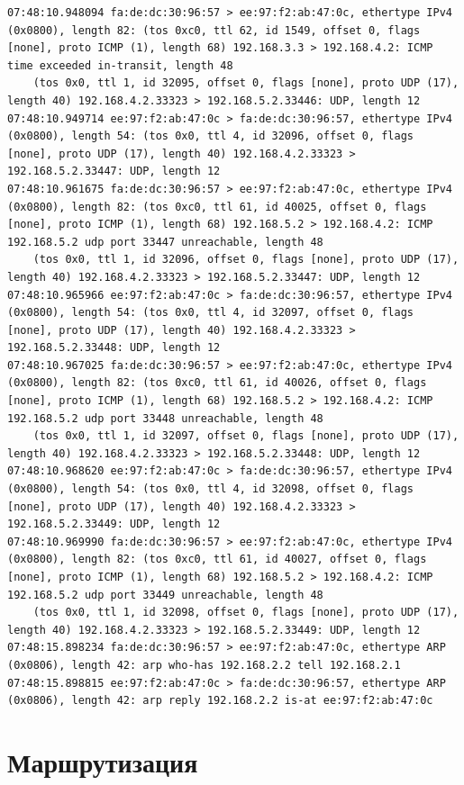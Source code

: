 \documentclass[a4paper,12pt]{article}
\begin{document}
\begin{Verbatim}
07:48:10.948094 fa:de:dc:30:96:57 > ee:97:f2:ab:47:0c, ethertype IPv4 (0x0800), length 82: (tos 0xc0, ttl 62, id 1549, offset 0, flags [none], proto ICMP (1), length 68) 192.168.3.3 > 192.168.4.2: ICMP time exceeded in-transit, length 48
	(tos 0x0, ttl 1, id 32095, offset 0, flags [none], proto UDP (17), length 40) 192.168.4.2.33323 > 192.168.5.2.33446: UDP, length 12
07:48:10.949714 ee:97:f2:ab:47:0c > fa:de:dc:30:96:57, ethertype IPv4 (0x0800), length 54: (tos 0x0, ttl 4, id 32096, offset 0, flags [none], proto UDP (17), length 40) 192.168.4.2.33323 > 192.168.5.2.33447: UDP, length 12
07:48:10.961675 fa:de:dc:30:96:57 > ee:97:f2:ab:47:0c, ethertype IPv4 (0x0800), length 82: (tos 0xc0, ttl 61, id 40025, offset 0, flags [none], proto ICMP (1), length 68) 192.168.5.2 > 192.168.4.2: ICMP 192.168.5.2 udp port 33447 unreachable, length 48
	(tos 0x0, ttl 1, id 32096, offset 0, flags [none], proto UDP (17), length 40) 192.168.4.2.33323 > 192.168.5.2.33447: UDP, length 12
07:48:10.965966 ee:97:f2:ab:47:0c > fa:de:dc:30:96:57, ethertype IPv4 (0x0800), length 54: (tos 0x0, ttl 4, id 32097, offset 0, flags [none], proto UDP (17), length 40) 192.168.4.2.33323 > 192.168.5.2.33448: UDP, length 12
07:48:10.967025 fa:de:dc:30:96:57 > ee:97:f2:ab:47:0c, ethertype IPv4 (0x0800), length 82: (tos 0xc0, ttl 61, id 40026, offset 0, flags [none], proto ICMP (1), length 68) 192.168.5.2 > 192.168.4.2: ICMP 192.168.5.2 udp port 33448 unreachable, length 48
	(tos 0x0, ttl 1, id 32097, offset 0, flags [none], proto UDP (17), length 40) 192.168.4.2.33323 > 192.168.5.2.33448: UDP, length 12
07:48:10.968620 ee:97:f2:ab:47:0c > fa:de:dc:30:96:57, ethertype IPv4 (0x0800), length 54: (tos 0x0, ttl 4, id 32098, offset 0, flags [none], proto UDP (17), length 40) 192.168.4.2.33323 > 192.168.5.2.33449: UDP, length 12
07:48:10.969990 fa:de:dc:30:96:57 > ee:97:f2:ab:47:0c, ethertype IPv4 (0x0800), length 82: (tos 0xc0, ttl 61, id 40027, offset 0, flags [none], proto ICMP (1), length 68) 192.168.5.2 > 192.168.4.2: ICMP 192.168.5.2 udp port 33449 unreachable, length 48
	(tos 0x0, ttl 1, id 32098, offset 0, flags [none], proto UDP (17), length 40) 192.168.4.2.33323 > 192.168.5.2.33449: UDP, length 12
07:48:15.898234 fa:de:dc:30:96:57 > ee:97:f2:ab:47:0c, ethertype ARP (0x0806), length 42: arp who-has 192.168.2.2 tell 192.168.2.1
07:48:15.898815 ee:97:f2:ab:47:0c > fa:de:dc:30:96:57, ethertype ARP (0x0806), length 42: arp reply 192.168.2.2 is-at ee:97:f2:ab:47:0c
\end{Verbatim}


\section{Маршрутизация}
\end{document}
